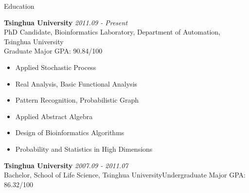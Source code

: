 \documentclass{resume} %
\begin{document}

\begin{rSection}{Education}

{\bf Tsinghua University} \hfill {\em 2011.09 - Present} \\ 
PhD Candidate, Bioinformatics Laboratory, Department of Automation, Tsinghua University\\
Graduate Major GPA: 90.84/100
\vspace{-3mm}
\begin{multicols}{2}
  \begin{itemize}
\item Applied Stochastic Process
\item Real Analysis, Basic Functional Analysis
\item Pattern Recognition, Probabilistic Graph
\item Applied Abstract Algebra
\item Design of Bioinformatics Algorithms
\item Probability and Statistics in High Dimensions 
  \end{itemize}
\end{multicols}
\vspace{-3mm}

{\bf Tsinghua University} \hfill {\em 2007.09 - 2011.07} \\
{Bachelor, School of Life Science, Tsinghua University}\hfill {Undergraduate Major GPA: 86.32/100}
\end{rSection}
  
\end{document}
